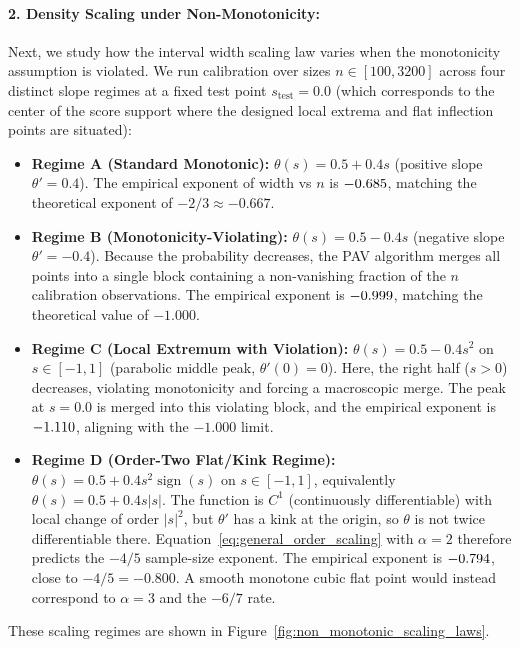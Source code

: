 \documentclass[11pt]{article}
\begin{document}
	\paragraph{2. Density Scaling under Non-Monotonicity:}
	Next, we study how the interval width scaling law varies when the monotonicity assumption is violated. We run calibration over sizes $n \in [100, 3200]$ across four distinct slope regimes at a fixed test point $s_{\text{test}} = 0.0$ (which corresponds to the center of the score support where the designed local extrema and flat inflection points are situated):
	\begin{itemize}
		\item \textbf{Regime A (Standard Monotonic):} $\theta(s) = 0.5 + 0.4 s$ (positive slope $\theta' = 0.4$). The empirical exponent of width vs $n$ is $-0.685{}$, matching the theoretical exponent of $-2/3 \approx -0.667$.
		\item \textbf{Regime B (Monotonicity-Violating):} $\theta(s) = 0.5 - 0.4 s$ (negative slope $\theta' = -0.4$). Because the probability decreases, the PAV algorithm merges all points into a single block containing a non-vanishing fraction of the $n$ calibration observations. The empirical exponent is $-0.999{}$, matching the theoretical value of $-1.000$.
		\item \textbf{Regime C (Local Extremum with Violation):} $\theta(s) = 0.5 - 0.4 s^2$ on $s \in [-1, 1]$ (parabolic middle peak, $\theta'(0) = 0$). Here, the right half ($s > 0$) decreases, violating monotonicity and forcing a macroscopic merge. The peak at $s=0.0$ is merged into this violating block, and the empirical exponent is $-1.110{}$, aligning with the $-1.000$ limit.
		\item \textbf{Regime D (Order-Two Flat/Kink Regime):} $\theta(s) = 0.5 + 0.4 s^2 \operatorname{sign}(s)$ on $s \in [-1, 1]$, equivalently $\theta(s) = 0.5 + 0.4 s|s|$. The function is $C^1$ (continuously differentiable) with local change of order $|s|^2$, but $\theta'$ has a kink at the origin, so $\theta$ is not twice differentiable there. Equation~\ref{eq:general_order_scaling} with $\alpha=2$ therefore predicts the $-4/5$ sample-size exponent. The empirical exponent is $-0.794{}$, close to $-4/5=-0.800$. A smooth monotone cubic flat point would instead correspond to $\alpha=3$ and the $-6/7$ rate.
	\end{itemize}
	These scaling regimes are shown in Figure~\ref{fig:non_monotonic_scaling_laws}.
	
\end{document}
